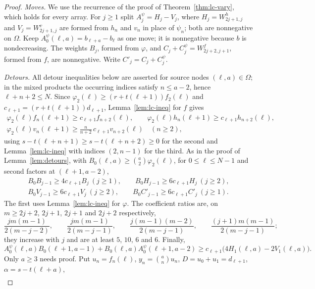 \begin{proof}
\emph{Moves.} We use the recurrence of the proof of Theorem~\ref{thm:lc-vary}, which holds for every array. For $j\geq1$ split $A^\psi_j=H_j-V_j$, where $H_j=W^h_{2j+1,j}$ and $V_j=W^v_{2j+1,j}$ are formed from $h_n$ and $v_n$ in place of $\psi_n$; both are nonnegative on $\Omega$. Keep $A^\psi_0(\ell,a)=b_{\ell+a}-b_\ell$ as one move; it is nonnegative because $b$ is nondecreasing. The weights $B_j$, formed from $\varphi$, and $C_j+C^\psi_j=W^f_{2j+2,j+1}$, formed from $f$, are nonnegative. Write $C'_j=C_j+C^\psi_j$.

\emph{Detours.} All detour inequalities below are asserted for source nodes $(\ell,a)\in\Omega$; in the mixed products the occurring indices satisfy $n\leq a-2$, hence $\ell+n+2\leq N$. Since $\varphi_2(\ell)\geq(r+t(\ell+1))f_2(\ell)$ and $c_{\ell+1}=(r+t(\ell+1))d_{\ell+1}$, Lemma~\ref{lem:lc-ineq} for $f$ gives
\[
\begin{gathered}
\varphi_2(\ell)f_n(\ell+1)\geq c_{\ell+1}f_{n+2}(\ell),\qquad\varphi_2(\ell)h_n(\ell+1)\geq c_{\ell+1}h_{n+2}(\ell),\\
\varphi_2(\ell)v_n(\ell+1)\geq\tfrac{n}{n+2}\,c_{\ell+1}v_{n+2}(\ell)\quad(n\geq2),
\end{gathered}
\]
using $s-t(\ell+n+1)\geq s-t(\ell+n+2)\geq0$ for the second and Lemma~\ref{lem:lc-ineq} with indices $(2,n-1)$ for the third. As in the proof of Lemma~\ref{lem:detours}, with $B_0(\ell,a)\geq\binom a2\varphi_2(\ell)$, for $0\leq\ell\leq N-1$ and second factors at $(\ell+1,a-2)$,
\[
\begin{gathered}
B_0B_{j-1}\geq4c_{\ell+1}B_j\ (j\geq1),\qquad B_0H_{j-1}\geq6c_{\ell+1}H_j\ (j\geq2),\\
B_0V_{j-1}\geq6c_{\ell+1}V_j\ (j\geq2),\qquad B_0C'_{j-1}\geq6c_{\ell+1}C'_j\ (j\geq1).
\end{gathered}
\]
The first uses Lemma~\ref{lem:lc-ineq} for $\varphi$. The coefficient ratios are, on $m\geq2j+2$, $2j+1$, $2j+1$ and $2j+2$ respectively,
\[
\frac{jm(m-1)}{2(m-j-2)},\qquad\frac{jm(m-1)}{2(m-j-1)},\qquad\frac{j(m-1)(m-2)}{2(m-j-1)},\qquad\frac{(j+1)m(m-1)}{2(m-j-1)};
\]
they increase with $j$ and are at least $5$, $10$, $6$ and $6$. Finally,
\begin{equation}\label{eq:affine-key}
A^\psi_0(\ell,a)B_0(\ell+1,a-1)+B_0(\ell,a)A^\psi_0(\ell+1,a-2)\geq c_{\ell+1}\bigl(4H_1(\ell,a)-2V_1(\ell,a)\bigr).
\end{equation}
Only $a\geq3$ needs proof. Put $u_n=f_n(\ell)$, $y_n=\binom anu_n$, $D=u_0+u_1=d_{\ell+1}$, $\alpha=s-t(\ell+a)$,
\[
\begin{gathered}

\end{gathered}\]
\end{proof}
